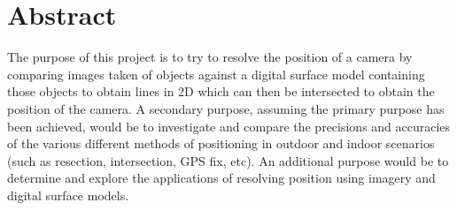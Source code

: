 \section{Abstract}
The purpose of this project is to try to resolve the position of a camera by comparing images taken of objects against a digital surface model containing those objects to obtain lines in 2D which can then be intersected to obtain the position of the camera. A secondary purpose, assuming the primary purpose has been achieved, would be to investigate and compare the precisions and accuracies of the various different methods of positioning in outdoor and indoor scenarios (such as resection, intersection, GPS fix, etc). An additional purpose would be to determine and explore the applications of resolving position using imagery and digital surface models.
